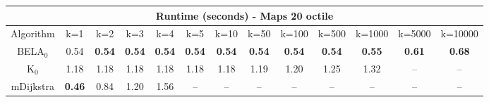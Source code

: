 \begin{tabular}{c|cccccccccccc}\toprule
\multicolumn{13}{c}{Runtime (seconds) - Maps 20 octile}\\ \midrule
Algorithm & k=1 & k=2 & k=3 & k=4 & k=5 & k=10 & k=50 & k=100 & k=500 & k=1000 & k=5000 & k=10000 \\ \midrule
BELA$_0$ & 0.54 & \textbf{0.54} & \textbf{0.54} & \textbf{0.54} & \textbf{0.54} & \textbf{0.54} & \textbf{0.54} & \textbf{0.54} & \textbf{0.54} & \textbf{0.55} & \textbf{0.61} & \textbf{0.68} \\
K$_0$ & 1.18 & 1.18 & 1.18 & 1.18 & 1.18 & 1.18 & 1.19 & 1.20 & 1.25 & 1.32 & -- & -- \\
mDijkstra & \textbf{0.46} & 0.84 & 1.20 & 1.56 & -- & -- & -- & -- & -- & -- & -- & -- \\ \bottomrule 
\end{tabular}
